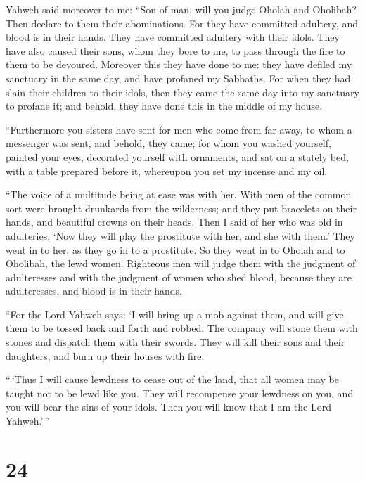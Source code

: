  Yahweh said moreover to me: ``Son of man, will you judge
Oholah and Oholibah? Then declare to them their abominations.
 For they have committed adultery, and blood is in their
hands. They have committed adultery with their idols. They have also
caused their sons, whom they bore to me, to pass through the fire to
them to be devoured.  Moreover this they have done to me:
they have defiled my sanctuary in the same day, and have profaned my
Sabbaths.  For when they had slain their children to
their idols, then they came the same day into my sanctuary to profane
it; and behold, they have done this in the middle of my house.

 ``Furthermore you sisters have sent for men who come
from far away, to whom a messenger was sent, and behold, they came; for
whom you washed yourself, painted your eyes, decorated yourself with
ornaments,  and sat on a stately bed, with a table
prepared before it, whereupon you set my incense and my oil.

 ``The voice of a multitude being at ease was with her.
With men of the common sort were brought drunkards from the wilderness;
and they put bracelets on their hands, and beautiful crowns on their
heads.  Then I said of her who was old in adulteries,
`Now they will play the prostitute with her, and she with them.'
 They went in to her, as they go in to a prostitute. So
they went in to Oholah and to Oholibah, the lewd women. 
Righteous men will judge them with the judgment of adulteresses and with
the judgment of women who shed blood, because they are adulteresses, and
blood is in their hands.

 ``For the Lord Yahweh says: `I will bring up a mob
against them, and will give them to be tossed back and forth and robbed.
 The company will stone them with stones and dispatch
them with their swords. They will kill their sons and their daughters,
and burn up their houses with fire.

 ``\,`Thus I will cause lewdness to cease out of the
land, that all women may be taught not to be lewd like you.
 They will recompense your lewdness on you, and you will
bear the sins of your idols. Then you will know that I am the Lord
Yahweh.'\,''

\hypertarget{section-23}{%
\section{24}\label{section-23}}

